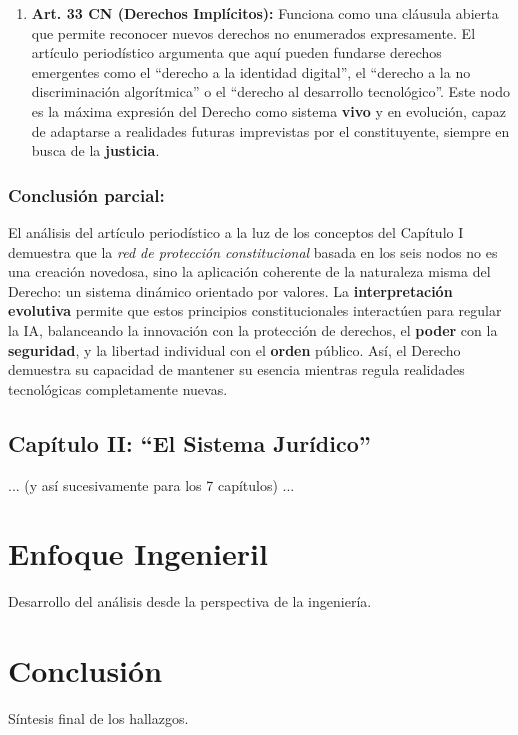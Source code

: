 \documentclass[11pt, a4paper]{article}
\begin{document}
\begin{enumerate}
    \item \textbf{Art. 33 CN (Derechos Implícitos):} Funciona como una cláusula abierta que permite reconocer nuevos derechos no enumerados expresamente. El artículo periodístico argumenta que aquí pueden fundarse derechos emergentes como el ``derecho a la identidad digital'', el ``derecho a la no discriminación algorítmica'' o el ``derecho al desarrollo tecnológico''. Este nodo es la máxima expresión del Derecho como sistema \textbf{vivo} y en evolución, capaz de adaptarse a realidades futuras imprevistas por el constituyente, siempre en busca de la \textbf{justicia}.
\end{enumerate}

\subsubsection*{Conclusión parcial:}
El análisis del artículo periodístico a la luz de los conceptos del Capítulo I demuestra que la \emph{red de protección constitucional} basada en los seis nodos no es una creación novedosa, sino la aplicación coherente de la naturaleza misma del Derecho: un sistema dinámico orientado por valores. La \textbf{interpretación evolutiva} permite que estos principios constitucionales interactúen para regular la IA, balanceando la innovación con la protección de derechos, el \textbf{poder} con la \textbf{seguridad}, y la libertad individual con el \textbf{orden} público. Así, el Derecho demuestra su capacidad de mantener su esencia mientras regula realidades tecnológicas completamente nuevas.

\subsection{Capítulo II: ``El Sistema Jurídico''}
\label{subsec:sistema}
... (y así sucesivamente para los 7 capítulos) ...

\section{Enfoque Ingenieril}
\label{sec:ingenieril}
Desarrollo del análisis desde la perspectiva de la ingeniería.

\section{Conclusión}
\label{sec:conclusion}
Síntesis final de los hallazgos.

\printbibliography

\end{document}

